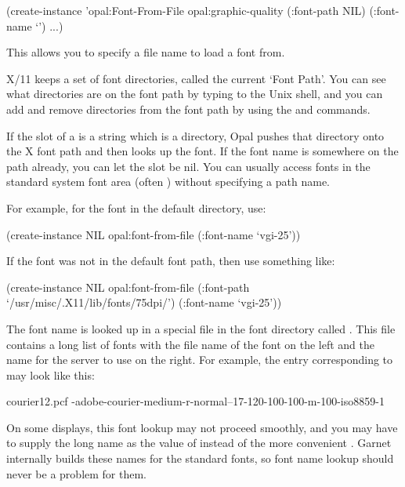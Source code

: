 \begin{programexample}
(create-instance 'opal:Font-From-File opal:graphic-quality
  (:font-path NIL)
  (:font-name `')
   ...)
\end{programexample}

This allows you to specify a file name to load a font from.

X/11 keeps a set of font directories, called the current `Font Path'.
You can see what directories are on the font path by typing 
to the Unix shell, and you can add and remove directories from the
font path by using the  and  commands.

If the  slot of a  is a string
which is a directory, Opal pushes that directory onto
the X font path and then looks up the font.  If the font name is
somewhere on the path already, you can let the  slot be {\sc nil}.
You can usually access fonts in the standard system font area (often
) without specifying a path name.

For example, for the font  in the default
directory, use:
\begin{programexample}
(create-instance NIL opal:font-from-file
   (:font-name `vgi-25'))
\end{programexample}
If the font was not in the default font path, then use something like:
\begin{programexample}
(create-instance NIL opal:font-from-file
   (:font-path `/usr/misc/.X11/lib/fonts/75dpi/')
   (:font-name `vgi-25'))
\end{programexample}

The font name  is looked up in a special file in the font
directory called .  This file contains a long list of fonts
with the file name of the font on the left and the name for the server to
use on the right.  For example, the entry corresponding to
 may look like this:

\begin{programexample}
courier12.pcf           -adobe-courier-medium-r-normal--17-120-100-100-m-100-iso8859-1
\end{programexample}

On some displays, this font lookup may not proceed smoothly, and you may have
to supply the long  name as the value of 
instead of the more convenient .  Garnet internally builds
these names for the standard fonts, so font name lookup should never be a
problem for them.


